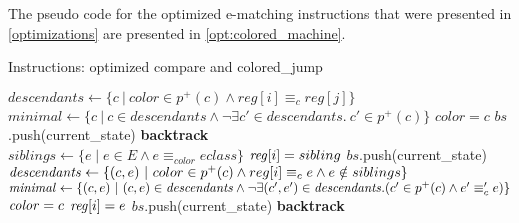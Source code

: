 The pseudo code for the optimized e-matching instructions that were presented in \autoref{optimizations} are presented in \autoref{opt:colored_machine}.

\begin{algorithm}[t]
\caption{ \label{opt:colored_machine}
Instructions: optimized compare and colored\_jump}
\begin{algorithmic}[1]

        \State $descendants \gets \{ c ~|~ color \in p^+(c) \land reg[i] \equiv_c reg[j] \}$
        \State $minimal \gets \{ c ~|~ c 
        \in descendants \land \lnot \exists c' \in descendants.~c' \in p^+(c) \}$
            \State $color = c$
            \State $bs$.push(current\_state)
        \EndFor
        \State \textbf{backtrack}
    \EndIf
\EndFunction
\\
    \State $siblings \gets \{e \mid e \in E \land e \equiv_{color} eclass\}$
        \State $\mathit{reg}[i] = sibling$
        \State $bs$.push(current\_state)
    \EndFor
    \State $\mathit{descendants} \gets \{ (c, e) ~|~ color \in p^+(c) \land reg[i] \equiv_c e \land e \notin siblings \}$
    \State $\mathit{minimal} \gets \{ (c, e) ~|~ (c, e) \in \mathit{descendants} \land \lnot \exists (c', e') \in \mathit{descendants}. (c' \in p^+(c) \land e' \equiv_c' e) \}$
        \State $\mathit{color} = c$
        \State $\mathit{reg}[i] = e$
        \State $bs$.push(current\_state)
    \EndFor
    \State \textbf{backtrack}
\EndFunction

\end{algorithmic}
\end{algorithm}
